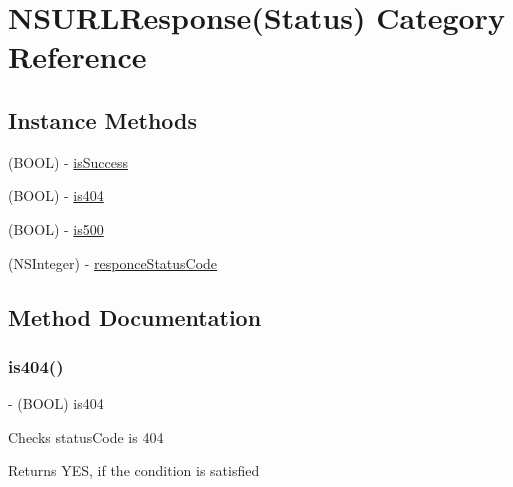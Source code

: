 \hypertarget{category_n_s_u_r_l_response_07_status_08}{}\section{N\+S\+U\+R\+L\+Response(Status) Category Reference}
\label{category_n_s_u_r_l_response_07_status_08}
\subsection*{Instance Methods}
\begin{DoxyCompactItemize}
\item 
(B\+O\+OL) -\/ \hyperlink{category_n_s_u_r_l_response_07_status_08_a69e713cc81bab91cccce25e2945cab9b}{is\+Success}
\item 
(B\+O\+OL) -\/ \hyperlink{category_n_s_u_r_l_response_07_status_08_a2423e0fb31a1574f000da83738c5850a}{is404}
\item 
(B\+O\+OL) -\/ \hyperlink{category_n_s_u_r_l_response_07_status_08_aa1c366b40bb957145d6a522e4a0745d6}{is500}
\item 
(N\+S\+Integer) -\/ \hyperlink{category_n_s_u_r_l_response_07_status_08_a5819f93f5ac9ed26e060d4c3489ae9bc}{responce\+Status\+Code}
\end{DoxyCompactItemize}


\subsection{Method Documentation}
\hypertarget{category_n_s_u_r_l_response_07_status_08_a2423e0fb31a1574f000da83738c5850a}{}\label{category_n_s_u_r_l_response_07_status_08_a2423e0fb31a1574f000da83738c5850a} 
\subsubsection{\texorpdfstring{is404()}{is404()}}
{\footnotesize\ttfamily -\/ (B\+O\+OL) is404 \begin{DoxyParamCaption}{ }\end{DoxyParamCaption}}

Checks status\+Code is 404 \begin{DoxyReturn}{Returns}
Y\+ES, if the condition is satisfied 
\end{DoxyReturn}
\hypertarget{category_n_s_u_r_l_response_07_status_08_aa1c366b40bb957145d6a522e4a0745d6}{}\label{category_n_s_u_r_l_response_07_status_08_aa1c366b40bb957145d6a522e4a0745d6} 
